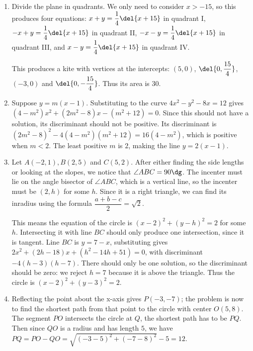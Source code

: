 \documentclass[10pt,paper=letter]{scrartcl}
\begin{document}
\begin{enumerate}
\item Divide the plane in quadrants. We only need to consider $x > -15$, so this produces four equations: $x + y = \dfrac14\del{x + 15}$ in quadrant I, $-x + y = \dfrac14\del{x + 15}$ in quadrant II, $-x -y = \dfrac14\del{x+15}$ in quadrant III, and $x - y = \dfrac14\del{x+15}$ in quadrant IV. 

This produces a kite with vertices at the intercepts: $(5, 0)$, $\del{0, \dfrac{15}4}$, $(-3, 0)$ and $\del{0, -\dfrac{15}4}$. Thus its area is $30$.

\item Suppose $y = m(x-1)$. Substituting to the curve $4x^2 - y^2 - 8x = 12$ gives $(4 - m^2)x^2 + (2m^2 - 8)x - (m^2 + 12) = 0$. Since this should not have a solution, its discriminant should not be positive. Its discriminant is $(2m^2 - 8)^2 - 4(4 - m^2)(m^2 + 12) = 16(4 - m^2)$, which is positive when $m < 2$. The least positive $m$ is $2$, making the line $y = 2(x-1)$. 

\item Let $A(-2, 1), B(2, 5)$ and $C(5, 2)$. After either finding the side lengths or looking at the slopes, we notice that $\angle ABC = 90\dg$. The incenter must lie on the angle bisector of $\angle ABC$, which is a vertical line, so the incenter must be $(2, h)$ for some $h$. Since it is a right triangle, we can find its inradius using the formula $\dfrac{a + b - c}2 = \sqrt2$. 

This means the equation of the circle is $(x - 2)^2 + (y - h)^2 = 2$ for some $h$. Intersecting it with line $BC$ should only produce one intersection, since it is tangent. Line $BC$ is $y = 7-x$, substituting gives $2x^2 + (2h - 18)x + (h^2 - 14h + 51) = 0$, with discriminant $-4(h-3)(h-7)$. There should only be one solution, so the discriminant should be zero: we reject $h = 7$ because it is above the triangle. Thus the circle is $(x - 2)^2 + (y - 3)^2 = 2$.

\item Reflecting the point about the x-axis gives $P(-3, -7)$; the problem is now to find the shortest path from that point to the circle with center $O(5, 8)$. The segment $PO$ intersects the circle at $Q$, the shortest path has to be $PQ$. Then since $QO$ is a radius and has length $5$, we have $PQ = PO - QO = \sqrt{(-3 - 5)^2 + (-7 - 8)^2} - 5 = 12$.

\end{enumerate}
\end{document}
